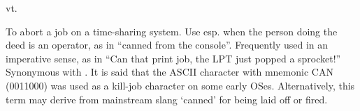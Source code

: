  vt.

To abort a job on a time-sharing system. Use esp. when the person doing the deed
is an operator, as in ``canned from the console''. Frequently used in an
imperative sense, as in ``Can that print job, the LPT just popped a sprocket!''
Synonymous with . It is said that the ASCII character with
mnemonic CAN (0011000) was used as a kill-job character on some early OSes.
Alternatively, this term may derive from mainstream slang `canned' for being
laid off or fired.

